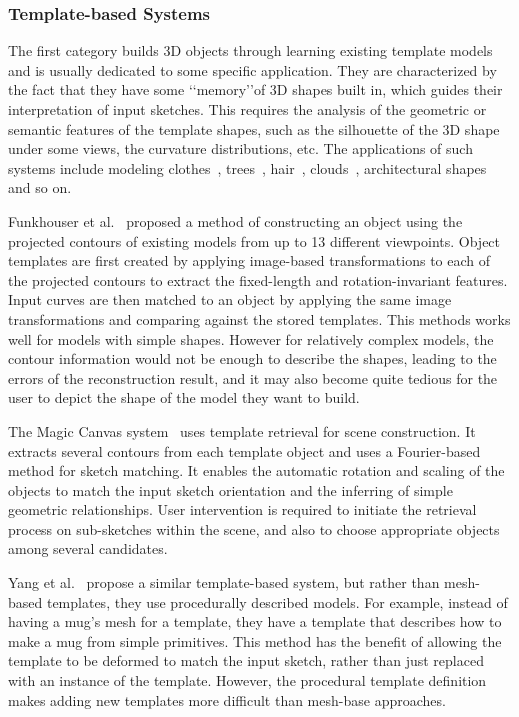 \subsubsection{Template-based Systems}\label{ch2:sec:sbim:creation:1}
The first category builds 3D objects through learning existing template models and is usually dedicated to some specific application. They are characterized by the fact that they have some \lq\lq{memory}\rq\rq of 3D shapes built in, which guides their interpretation of input sketches. This requires the analysis of the geometric or semantic features of the template shapes, such as the silhouette of the 3D shape under some views, the curvature distributions, etc. The applications of such systems include modeling clothes~\cite{TWBCH07}, trees~\cite{TST06,OOI06}, hair~\cite{WBC07}, clouds~\cite{WBC08}, architectural shapes~\cite{SketchUp} and so on.

Funkhouser et al.~\cite{FMKCHDJ03} proposed a method of constructing an object using the projected contours of existing models from up to 13 different viewpoints. Object templates are first created by applying image-based transformations to each of the projected contours to extract the fixed-length and rotation-invariant features. Input curves are then matched to an object by applying the same image transformations and comparing against the stored templates. This methods works well for models with simple shapes. However for relatively complex models, the contour information would not be enough to describe the shapes, leading to the errors of the reconstruction result, and it may also become quite tedious for the user to depict the shape of the model they want to build.

The Magic Canvas system~\cite{SI07} uses template retrieval for scene construction. It extracts several contours from each template object and uses a Fourier-based method for sketch matching. It enables the automatic rotation and scaling of the objects to match the input sketch orientation and the inferring of simple geometric relationships. User intervention is required to initiate the retrieval process on sub-sketches within the scene, and also to choose appropriate objects among several candidates.

Yang et al.~\cite{YSM05} propose a similar template-based system, but rather than mesh-based templates, they use procedurally described models. For example, instead of having a mug's mesh for a template, they have a template that describes how to make a mug from simple primitives. This method has the benefit of allowing the template to be deformed to match the input sketch, rather than just replaced with an instance of the template. However, the procedural template definition makes adding new templates more difficult than mesh-base approaches.

